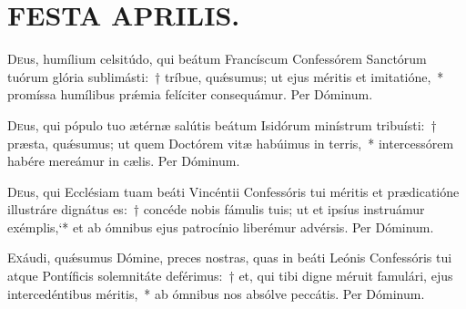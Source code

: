\documentclass[vesperale_romanum.tex]{subfiles}
\begin{document}
\section[Festa Aprilis]{FESTA APRILIS.}

\duplex

\oratio

\lettrine{D}{e}us, humílium celsitúdo, qui beátum Francíscum Confessórem Sanctórum tuórum glória sublimásti:~† tríbue, quǽsumus; ut ejus méritis et imitatióne,~* promíssa humílibus prǽmia felíciter consequámur.
Per Dóminum.

\quadcommferiae

\myrule
{}

\duplex

\oratio

\lettrine{D}{e}us, qui pópulo tuo ætérnæ salútis beátum Isidórum minístrum tribuísti:~† præsta, quǽsumus; ut quem Doctórem vitæ habúimus in terris,~* intercessórem habére mereámur in cælis. Per Dóminum.

 \quadcommferiae
 
\capitdeseqquad

\myrule
{}

\duplex

\oratio

\lettrine{D}{e}us, qui Ecclésiam tuam beáti Vincéntii Confessóris tui méritis et prædicatióne illustráre dignátus es:~† concéde nobis fámulis tuis; ut et ipsíus instruámur exémplis,`* et ab ómnibus ejus patrocínio liberémur advérsis. Per Dóminum.


\myrule

\newpage


\duplex

\oratio

\lettrine{E}{x}áudi, quǽsumus Dómine, preces nostras, quas in beáti Leónis Confessóris tui atque Pontíficis solemnitáte deférimus:~† et, qui tibi digne méruit famulári, ejus intercedéntibus méritis,~* ab ómnibus nos absólve peccátis. Per Dóminum.
\end{document}
